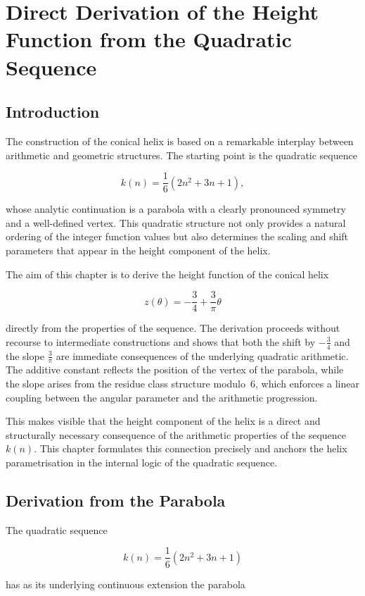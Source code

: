 \chapter{Direct Derivation of the Height Function from the Quadratic Sequence}
\section{Introduction}

The construction of the conical helix is based on a remarkable interplay
between arithmetic and geometric structures. The starting point is the
quadratic sequence

\[
k(n)=\frac{1}{6}(2n^{2}+3n+1),
\]

whose analytic continuation is a parabola with a clearly pronounced
symmetry and a well-defined vertex. This quadratic structure not only
provides a natural ordering of the integer function values but also
determines the scaling and shift parameters that appear in the height
component of the helix.

The aim of this chapter is to derive the height function of the conical
helix

\[
z(\theta)=-\frac{3}{4}+\frac{3}{\pi}\theta
\]

directly from the properties of the sequence. The derivation proceeds
without recourse to intermediate constructions and shows that both the
shift by $-\tfrac{3}{4}$ and the slope $\tfrac{3}{\pi}$ are immediate
consequences of the underlying quadratic arithmetic. The additive
constant reflects the position of the vertex of the parabola, while the
slope arises from the residue class structure modulo~$6$, which enforces
a linear coupling between the angular parameter and the arithmetic
progression.

This makes visible that the height component of the helix is a direct
and structurally necessary consequence of the arithmetic properties of
the sequence $k(n)$. This chapter formulates this connection precisely
and anchors the helix parametrisation in the internal logic of the
quadratic sequence.

\section{Derivation from the Parabola}

The quadratic sequence

\[
k(n)=\frac{1}{6}(2n^{2}+3n+1)
\]

has as its underlying continuous extension the parabola

